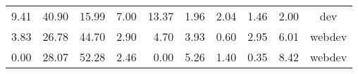 \begin{table*}[]
\begin{tabular}{@{}rrrrrrrrrc@{}}
      9.41                                                                            & 40.90                                                                                  & 15.99                                                                          & 7.00                                                                                     & 13.37                                                                                    & 1.96                                                                            & 2.04                                                                                     & 1.46                                                                           & 2.00                                                                             & dev                                                           \\
      3.83                                                                            & 26.78                                                                                  & 44.70                                                                          & 2.90                                                                                     & 4.70                                                                                     & 3.93                                                                            & 0.60                                                                                     & 2.95                                                                           & 6.01                                                                             & webdev                                                        \\
      0.00                                                                            & 28.07                                                                                  & 52.28                                                                          & 2.46                                                                                     & 0.00                                                                                     & 5.26                                                                            & 1.40                                                                                     & 0.35                                                                           & 8.42                                                                             & webdev                                                        \\

\end{tabular}
\end{table*}
